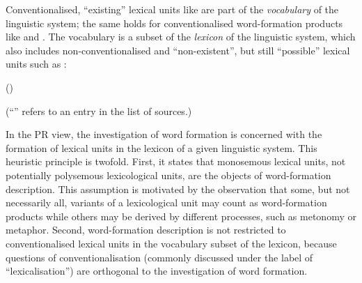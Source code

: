 \documentclass[output=paper
  ,nobabel
  ,draftmode
  ,colorlinks, citecolor=brown
]{langscibook}
\begin{document}
Conventionalised, ``existing'' lexical units like \emph{} are part of the
\emph{vocabulary} of the linguistic system; the same holds for
conventionalised word-formation products like \emph{} and \emph{}. The vocabulary is a subset of the
\emph{lexicon} of the linguistic system, which also includes
non-conventionalised and ``non-existent'', but still
``possible'' lexical units such as \emph{}: \begin{exe}
\ex \raggedright \begin{taggedline}[0.99]{()}
\begin{pairingline}
\end{pairingline}
\end{taggedline}
\end{exe} 
(``'' refers to an entry
in the list of sources.)

In the PR view, the investigation of word formation is concerned with the
formation of lexical units in the lexicon of a given linguistic system. This
heuristic principle is twofold. First, it states that monosemous lexical units,
not potentially polysemous lexicological units, are the objects of
word-formation description. This assumption is motivated by the observation that
some, but not necessarily all, variants of a lexicological unit may count as
word-formation products while others may be derived by different processes, such
as metonomy or metaphor. Second, word-formation description is not restricted to
conventionalised lexical units in the vocabulary subset of the lexicon, because
questions of conventionalisation (commonly discussed under the label of
``lexicalisation'') are orthogonal to the investigation of word
formation.
\end{document}
